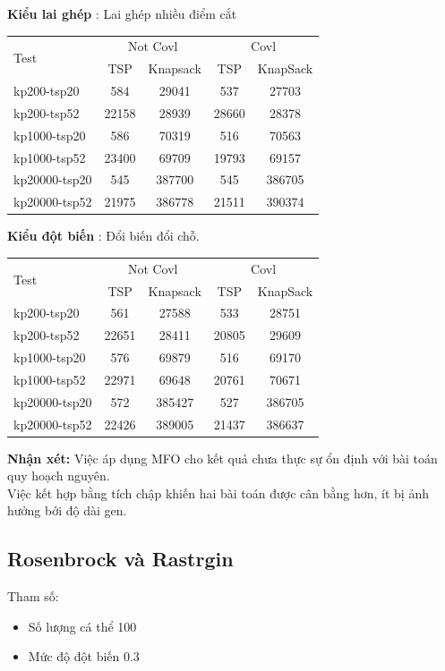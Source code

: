\documentclass[a4paper,12pt]{report}
\begin{document}
\textbf{Kiểu lai ghép} : Lai ghép nhiều điểm cắt

\begin{longtable}{|l |c |c |c |c|}
\hline
\multirow{2}{*}{Test} 
& \multicolumn{2}{c|}{Not Covl} &\multicolumn{2}{|c|}{Covl} \\
\cline{2-5}
&TSP & Knapsack & TSP & KnapSack \\
\hline
kp200-tsp20  & 584&29041 &537 &27703 
\\ \hline
kp200-tsp52&22158 &28939&28660 &28378 \\ \hline
kp1000-tsp20 &586&70319&516&70563 \\ \hline
kp1000-tsp52 &23400&69709&19793&69157 \\ \hline
kp20000-tsp20 &545&387700&545 &386705 \\ \hline
kp20000-tsp52 &21975&386778&21511& 390374\\ \hline
\end{longtable}
\textbf{Kiểu đột biến} : Đổi biến đổi chỗ.

\begin{longtable}{|l |c |c |c |c|}
\hline
\multirow{2}{*}{Test} 
& \multicolumn{2}{c|}{Not Covl} &\multicolumn{2}{|c|}{Covl} \\
\cline{2-5}
&TSP & Knapsack & TSP & KnapSack \\
\hline
kp200-tsp20  & 561&27588 &533 &28751 
\\ \hline
kp200-tsp52&22651 &28411&20805 &29609 \\ \hline
kp1000-tsp20 &576&69879&516&69170 \\ \hline
kp1000-tsp52 &22971&69648&20761&70671 \\ \hline
kp20000-tsp20 &572&385427&527 &386705 \\ \hline

kp20000-tsp52 &22426 & 389005 & 21437 & 386637\\
\hline
\end{longtable}
\textbf{Nhận xét:}
Việc áp dụng MFO cho kết quả chưa thực sự ổn định với bài toán quy hoạch nguyên. \\

Việc kết hợp bằng tích chập khiến hai bài toán  được cân bằng hơn, ít bị ảnh hưởng bới độ dài gen.
\subsection{Rosenbrock và Rastrgin}
Tham số:

\begin{itemize}
\item Số lượng cá thể 100
\item Mức độ đột biến 0.3
\end{itemize}
\end{document}
